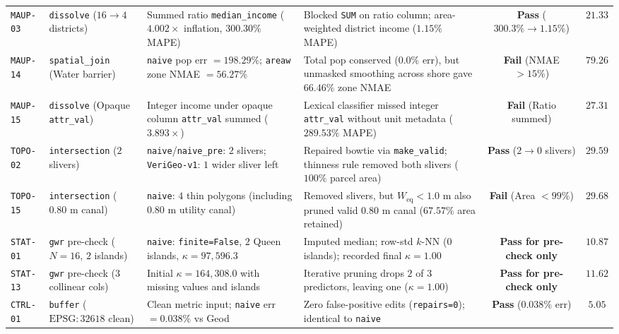 \documentclass[10pt,twocolumn]{article}
\begin{document}
\begin{table}[t]
{\begin{tabular}{ll>{\raggedright\arraybackslash}p{4.8cm}>{\raggedright\arraybackslash}p{5.2cm}cc}
\texttt{MAUP-03} & \texttt{dissolve} ($16 \to 4$ districts) & Summed ratio \texttt{median\_income} ($4.002\times$ inflation, $300.30\%$ MAPE) & Blocked \texttt{SUM} on ratio column; area-weighted district income ($1.15\%$ MAPE) & \textbf{Pass} ($300.3\% \to 1.15\%$) & $21.33$ \\
\texttt{MAUP-14} & \texttt{spatial\_join} (Water barrier) & \texttt{naive} pop err $=198.29\%$; \texttt{areaw} zone NMAE $=56.27\%$ & Total pop conserved ($0.0\%$ err), but unmasked smoothing across shore gave $66.46\%$ zone NMAE & \textbf{Fail} (NMAE $> 15\%$) & $79.26$ \\
\texttt{MAUP-15} & \texttt{dissolve} (Opaque \texttt{attr\_val}) & Integer income under opaque column \texttt{attr\_val} summed ($3.893\times$) & Lexical classifier missed integer \texttt{attr\_val} without unit metadata ($289.53\%$ MAPE) & \textbf{Fail} (Ratio summed) & $27.31$ \\
\midrule
\texttt{TOPO-02} & \texttt{intersection} ($2$ slivers) & \texttt{naive}/\texttt{naive\_pre}: $2$ slivers; \texttt{VeriGeo-v1}: $1$ wider sliver left & Repaired bowtie via \texttt{make\_valid}; thinness rule removed both slivers ($100\%$ parcel area) & \textbf{Pass} ($2 \to 0$ slivers) & $29.59$ \\
\texttt{TOPO-15} & \texttt{intersection} ($0.80\text{ m}$ canal) & \texttt{naive}: $4$ thin polygons (including $0.80\text{ m}$ utility canal) & Removed slivers, but $W_{\text{eq}} < 1.0\text{ m}$ also pruned valid $0.80\text{ m}$ canal ($67.57\%$ area retained) & \textbf{Fail} (Area $< 99\%$) & $29.68$ \\
\midrule
\texttt{STAT-01} & \texttt{gwr} pre-check ($N=16$, $2$ islands) & \texttt{naive}: \texttt{finite=False}, $2$ Queen islands, $\kappa=97,596.3$ & Imputed median; row-std $k$-NN ($0$ islands); recorded final $\kappa=1.00$ & \textbf{Pass for pre-check only} & $10.87$ \\
\texttt{STAT-13} & \texttt{gwr} pre-check ($3$ collinear cols) & Initial $\kappa=164,308.0$ with missing values and islands & Iterative pruning drops $2$ of $3$ predictors, leaving one ($\kappa=1.00$) & \textbf{Pass for pre-check only} & $11.62$ \\
\midrule
\texttt{CTRL-01} & \texttt{buffer} ($\text{EPSG}:32618$ clean) & Clean metric input; \texttt{naive} err $=0.038\%$ vs Geod & Zero false-positive edits (\texttt{repairs=0}); identical to \texttt{naive} & \textbf{Pass} ($0.038\%$ err) & $5.05$ \\
\bottomrule
\end{tabular}%
}
\end{table}
\end{document}
